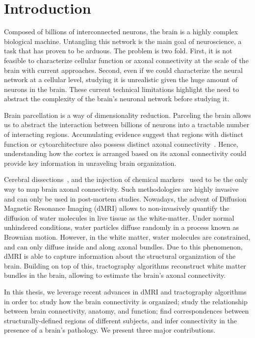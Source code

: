 \chapter{Introduction}

Composed of billions of interconnected neurons, the brain is a highly complex
biological machine. Untangling this network is the main goal of neuroscience,
a task that has proven to be arduous. The problem is two fold. First, it is
not feasible to characterize cellular function or axonal connectivity at the
scale of the brain with current approaches. Second, even if we could characterize
the neural network at a cellular level, studying it is unrealistic given the
huge amount of neurons in the brain.
These current technical limitations highlight the need to abstract the complexity
of the brain's neuronal network before studying it.

Brain parcellation is a way of dimensionality reduction. Parceling the brain
allows us to abstract the interaction between billions of neurons into a tractable
number of interacting regions. Accumulating evidence suggest that regions with
distinct function or cytoarchitecture also possess distinct axonal connectivity~\citep{Passingham2002, Johansen-Berg2004, Honey2009, Eickhoff2010}.
Hence, understanding how the cortex is arranged based on its axonal connectivity
could provide key information in unraveling brain organization. 


Cerebral dissections~\cite{Meynert1872, Brodmann1909, Gray1918},
and the injection of chemical markers~\cite{Schmahmann2006, Stephan2013} used to
be the only way to map brain axonal connectivity. Such methodologies are highly
invasive and can only be used in post-mortem studies. Nowadays, the advent of
Diffusion Magnetic Resonance Imaging (dMRI) allows to non-invasively quantify
the diffusion of water molecules in live tissue as the white-matter. Under
normal unhindered conditions, water particles diffuse randomly in a process
known as Brownian motion. However, in the white matter, water molecules are
constrained, and can only diffuse inside and along axonal bundles. Due to this
phenomenon, dMRI is able to capture information about the structural organization
of the brain. Building on top of this, tractography algorithms reconstruct
white matter bundles in the brain, allowing to estimate the brain's axonal
connectivity.

In this thesis, we leverage recent advances in dMRI and tractography algorithms
in order to: study how the brain connectivity is organized; study the relationship
between brain connectivity, anatomy, and function; find correspondences between 
structurally-defined regions of different subjects, and infer connectivity in
the presence of a brain’s pathology. We present three major contributions.

